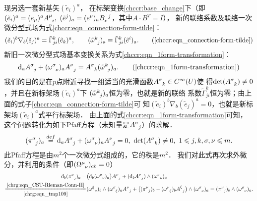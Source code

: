 现另选一套新基矢$(\tilde{e}_i)^a$，
在标架变换\eqref{chccr:base_change}下（即$(\tilde{e} _i)^a = (e_\mu)^{a} A_{\hphantom{\mu} i}^{\mu},\
(\tilde{e} ^j)_a = (e^\nu)_{a} B^{\hphantom{\mu} j}_{\nu}$，其中$A\cdot B^T=I$），
新的联络系数及联络一次微分型式场为式\eqref{chccr:eqn_connection-form-tilde}：
\begin{equation}
    (\tilde{e}_i)^b \nabla _b (\tilde{e}_j)^a  =
    \tilde{\Gamma}^{k}_{ji} (\tilde{e}_k)^a,   \qquad
    (\tilde{\omega} _{\hphantom{k} j}^{k})_a  \equiv
    \tilde{\Gamma}^{k}_{j i} (\tilde{e}^i)_a .
    \tag{\ref{chccr:eqn_connection-form-tilde}}
\end{equation}
新旧一次微分型式场基本变换关系为式\eqref{chccr:eqn_1form-transformation}：
\begin{equation}
    {\rm d}_a A_{\hphantom{\mu} j}^{\sigma} + (\omega ^{\sigma}_{\hphantom{\mu}\nu})_a  A_{\hphantom{\mu} j}^{\nu}
    =  A_{\hphantom{\mu} k}^{\sigma} (\tilde{\omega} _{\hphantom{k} j} ^{k})_a .
    \tag{\ref{chccr:eqn_1form-transformation}}
\end{equation}
我们的目的是在$p$点附近寻找一组适当的光滑函数$A_{\hphantom{\mu} k}^{\sigma}\in C^\infty(U)$使
得$\det(A_{\hphantom{\mu} k}^{\sigma})\neq 0$，并且在新标架场$(\tilde{e}_i)^a$下
\uwave{新一次联络型式场}$(\tilde{\omega} _{\hphantom{k} j} ^{k})_a $恒为零，也就是新的联络
系数$\tilde{\Gamma}^{k}_{j i}$恒为零；由上面的式子\eqref{chccr:eqn_connection-form-tilde}可
知$(\tilde{e}_i)^b \nabla _b (\tilde{e}_j)^a=0$，也就是新标架场$(\tilde{e}_i)^a$式平行标架场．
由上面的式\eqref{chccr:eqn_1form-transformation}可知，
这个问题转化为如下Pfaff方程（未知量是$A_{\hphantom{\mu} j}^{\sigma}$）的求解．
\begin{equation}\label{chrg:eqn_tmp109}
    (\pi _{\hphantom{\mu} j} ^{\sigma})_a \overset{def}{=}
    {\rm d}_a A_{\hphantom{\mu} j}^{\sigma} + (\omega ^{\sigma}_{\hphantom{\mu}\nu})_a  A_{\hphantom{\mu} j}^{\nu}=0,
    \ \det(A_{\hphantom{\mu} k}^{\sigma})\neq 0,\ 1 \leqslant j,k,\sigma,\nu \leqslant m .
\end{equation}
此Pfaff方程是由$m^2$个一次微分式组成的，它的秩是$m^2$．
我们对此式再次求外微分，并利用的条件（即$(\Omega_{\hphantom{\mu} \nu} ^{\mu})_{ab}=0$）
\begin{align*}
    {\rm d}_b(\pi _{\hphantom{\mu} j} ^{\sigma})_a =&
       \bigl({\rm d}_b (\omega ^{\sigma}_{\hphantom{\mu}\nu})_a\bigr)  A_{\hphantom{\mu} j}^{\nu}
      + ({\rm d}_b  A_{\hphantom{\mu} j}^{\nu}) \wedge (\omega ^{\sigma}_{\hphantom{\mu}\nu})_a   \\
    \xlongequal[\ref{chrg:eqn_tmp109}]{\ref{chrg:eqn_CST-Rieman-Conn-II}}&
    ( \omega _{\hphantom{\mu} \nu}^\xi )_b \wedge ( \omega _{\hphantom{\mu} \xi}^{\sigma} )_a  A_{\hphantom{\mu} j}^{\nu}
    + \bigl((\pi _{\hphantom{\mu} j} ^{\nu})_b-(\omega ^{\nu}_{\hphantom{\mu}\xi})_b  A_{\hphantom{\mu} j}^{\xi}\bigr)
     \wedge (\omega ^{\sigma}_{\hphantom{\mu}\nu})_a
     =(\pi _{\hphantom{\mu} j} ^{\nu})_b \wedge (\omega ^{\sigma}_{\hphantom{\mu}\nu})_a  .
\end{align*}
